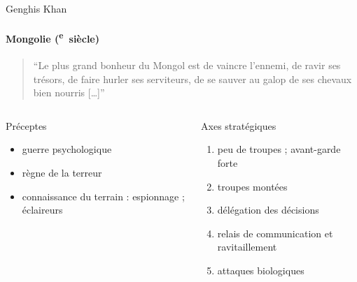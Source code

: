 \documentclass[utf8]{beamer}
\newcommand{\cRM}[1]{\MakeUppercase{\romannumeral #1}}  %
\newcommand{\siecle}[1]{\cRM{#1}\textsuperscript{e}~siècle}
\begin{document}
\begin{frame}{Genghis Khan}
\framesubtitle{Mongolie (\siecle{12})}
\begin{quote}“Le plus grand bonheur du Mongol est de vaincre l’ennemi, de ravir ses trésors, de faire hurler ses serviteurs, de se sauver au galop de ses chevaux bien nourris [\ldots]”\end{quote}
\vfill
\begin{columns}[t]
\begin{column}{0.5\linewidth}
Préceptes
\begin{itemize}
\item guerre psychologique
\item règne de la terreur
\item connaissance du terrain : espionnage ; éclaireurs
\end{itemize}
\end{column}
\begin{column}{0.5\linewidth}
Axes stratégiques
\begin{enumerate}
\item peu de troupes ; avant-garde forte
\item troupes montées %
\item délégation des décisions
\item relais de communication et ravitaillement
\item attaques biologiques
\end{enumerate}
\end{column}
\end{columns}
\end{frame}
\end{document}
